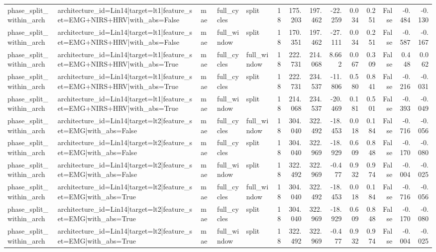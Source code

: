 \begin{table}
\begin{tabular}{lllllrrrrrrrrr}
phase_split_within_arch & architecture_id=Lin14|target=lt1|feature_set=EMG+NIRS+HRV|with_abs=False & mae & full_cycles & split & 18 & 175.203 & 197.462 & -22.259 & 0.034 & 0.251 & False & -0.484 & -0.130 \\
phase_split_within_arch & architecture_id=Lin14|target=lt1|feature_set=EMG+NIRS+HRV|with_abs=False & mae & full_window & split & 18 & 170.351 & 197.462 & -27.111 & 0.034 & 0.251 & False & -0.587 & -0.167 \\
phase_split_within_arch & architecture_id=Lin14|target=lt1|feature_set=EMG+NIRS+HRV|with_abs=True & mae & full_cycles & full_window & 18 & 222.731 & 214.068 & 8.662 & 0.067 & 0.309 & False & 0.448 & 0.062 \\
phase_split_within_arch & architecture_id=Lin14|target=lt1|feature_set=EMG+NIRS+HRV|with_abs=True & mae & full_cycles & split & 18 & 222.731 & 234.537 & -11.806 & 0.580 & 0.841 & False & -0.216 & -0.031 \\
phase_split_within_arch & architecture_id=Lin14|target=lt1|feature_set=EMG+NIRS+HRV|with_abs=True & mae & full_window & split & 18 & 214.068 & 234.537 & -20.469 & 0.181 & 0.501 & False & -0.393 & -0.049 \\
phase_split_within_arch & architecture_id=Lin14|target=lt2|feature_set=EMG|with_abs=False & mae & full_cycles & full_window & 18 & 304.040 & 322.492 & -18.453 & 0.018 & 0.184 & False & -0.716 & -0.056 \\
phase_split_within_arch & architecture_id=Lin14|target=lt2|feature_set=EMG|with_abs=False & mae & full_cycles & split & 18 & 304.040 & 322.969 & -18.929 & 0.609 & 0.848 & False & -0.170 & -0.080 \\
phase_split_within_arch & architecture_id=Lin14|target=lt2|feature_set=EMG|with_abs=False & mae & full_window & split & 18 & 322.492 & 322.969 & -0.477 & 0.932 & 0.974 & False & -0.004 & -0.025 \\
phase_split_within_arch & architecture_id=Lin14|target=lt2|feature_set=EMG|with_abs=True & mae & full_cycles & full_window & 18 & 304.040 & 322.492 & -18.453 & 0.018 & 0.184 & False & -0.716 & -0.056 \\
phase_split_within_arch & architecture_id=Lin14|target=lt2|feature_set=EMG|with_abs=True & mae & full_cycles & split & 18 & 304.040 & 322.969 & -18.929 & 0.609 & 0.848 & False & -0.170 & -0.080 \\
phase_split_within_arch & architecture_id=Lin14|target=lt2|feature_set=EMG|with_abs=True & mae & full_window & split & 18 & 322.492 & 322.969 & -0.477 & 0.932 & 0.974 & False & -0.004 & -0.025 \\

\end{tabular}
\end{table}
